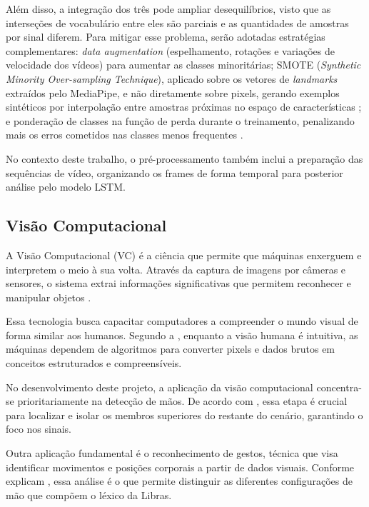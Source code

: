 \documentclass[
    12pt,                %
    openright,           %
    oneside,             %
    a4paper,             %
    english,             %
    brazil               %
]{abntex2}
\begin{document}
Além disso, a integração dos três pode ampliar desequilíbrios, visto que as interseções de vocabulário entre eles são parciais e as quantidades de amostras por sinal diferem. Para mitigar esse problema, serão adotadas estratégias complementares: \textit{data augmentation} (espelhamento, rotações e variações de velocidade dos vídeos) para aumentar as classes minoritárias; SMOTE (\textit{Synthetic Minority Over-sampling Technique}), aplicado sobre os vetores de \textit{landmarks} extraídos pelo MediaPipe, e não diretamente sobre pixels, gerando exemplos sintéticos por interpolação entre amostras próximas no espaço de características \cite{Chawla2002}; e ponderação de classes na função de perda durante o treinamento, penalizando mais os erros cometidos nas classes menos frequentes \cite{Goodfellow2016}.

No contexto deste trabalho, o pré-processamento também inclui a preparação das sequências de vídeo, organizando os frames de forma temporal para posterior análise pelo modelo LSTM.

\subsection{Visão Computacional}

A Visão Computacional (VC) é a ciência que permite que máquinas enxerguem e interpretem o meio à sua volta. Através da captura de imagens por câmeras e sensores, o sistema extrai informações significativas que permitem reconhecer e manipular objetos \cite{Milano2014}.

Essa tecnologia busca capacitar computadores a compreender o mundo visual de forma similar aos humanos. Segundo a , enquanto a visão humana é intuitiva, as máquinas dependem de algoritmos para converter pixels e dados brutos em conceitos estruturados e compreensíveis.

No desenvolvimento deste projeto, a aplicação da visão computacional concentra-se prioritariamente na detecção de mãos. De acordo com , essa etapa é crucial para localizar e isolar os membros superiores do restante do cenário, garantindo o foco nos sinais.

Outra aplicação fundamental é o reconhecimento de gestos, técnica que visa identificar movimentos e posições corporais a partir de dados visuais. Conforme explicam , essa análise é o que permite distinguir as diferentes configurações de mão que compõem o léxico da Libras.
\end{document}
